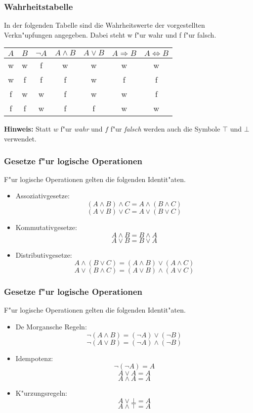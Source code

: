 \documentclass{beamer}
\begin{document}
\begin{frame}
  \frametitle{Wahrheitstabelle}
  In der folgenden Tabelle sind die Wahrheitswerte der vorgestellten Verkn"upfungen angegeben. Dabei steht w f"ur wahr und f f"ur falsch.
  \begin{tabular}[h]{c|c|c|c|c|c|c}
   
    $A$ & $B$ & $\neg A$ & $A\wedge B$ & $A\vee B$ & $A\Rightarrow B$ & $A\Leftrightarrow B$ \\
    \hline
    w & w & f & w & w & w & w \\
    w & f & f & f & w & f & f \\
    f & w & w & f & w & w & f \\
    f & f & w & f & f & w & w
    
  \end{tabular}
  
  \vspace{5mm}
  \textbf{Hinweis:} Statt $w$ f"ur \textit{wahr} und $f$ f"ur \textit{falsch} werden auch die Symbole $\top$ und $\bot$ verwendet.
  
\end{frame}

\begin{frame}
  \frametitle{Gesetze f"ur logische Operationen}
  F"ur logische Operationen gelten die folgenden Identit"aten. 
  \begin{itemize}
    \item Assoziativgesetze: \[(A\wedge B)\wedge C = A\wedge(B\wedge C)\] \[(A\vee B)\vee C = A\vee(B\vee C)\]
    \item Kommutativgesetze: \[A\wedge B = B\wedge A\]\[A\vee B = B\vee A\]
    \item Distributivgesetze: \[A \wedge (B\vee C) = (A\wedge B)\vee (A\wedge C)\] \[A\vee (B\wedge C) = (A\vee B)\wedge (A\vee C)\]
  \end{itemize}
   
\end{frame}


\begin{frame}
  \frametitle{Gesetze f"ur logische Operationen}
  F"ur logische Operationen gelten die folgenden Identit"aten. 
  \begin{itemize}
    \item De Morgansche Regeln: \[\neg(A\wedge B) = (\neg A)\vee(\neg B)\]\[\neg(A\vee B) = (\neg A)\wedge(\neg B)\]
    \item Idempotenz: \[\neg(\neg A) = A\]\[A\vee A = A\]\[A\wedge A = A\]
    \item K"urzungsregeln: \[A\vee\bot=A\]\[A\wedge\top=A\]
  \end{itemize}
   
\end{frame}
\end{document}
